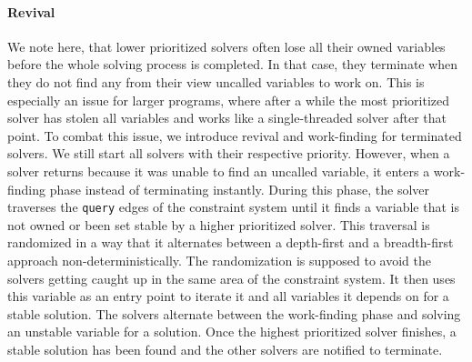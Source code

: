     \paragraph{Revival} We note here, that lower prioritized solvers often lose all their owned variables before the whole solving process is completed. In that case, they terminate when they do not find any from their view uncalled variables to work on. This is especially an issue for larger programs, where after a while the most prioritized solver has stolen all variables and works like a single-threaded solver after that point. To combat this issue, we introduce revival and work-finding for terminated solvers.
    We still start all solvers with their respective priority. However, when a solver returns because it was unable to find an uncalled variable, it enters a work-finding phase instead of terminating instantly. During this phase, the solver traverses the \texttt{query} edges of the constraint system until it finds a variable that is not owned or been set stable by a higher prioritized solver. This traversal is randomized in a way that it alternates between a depth-first and a breadth-first approach non-deterministically. The randomization is supposed to avoid the solvers getting caught up in the same area of the constraint system. It then uses this variable as an entry point to iterate it and all variables it depends on for a stable solution. The solvers alternate between the work-finding phase and solving an unstable variable for a solution. Once the highest prioritized solver finishes, a stable solution has been found and the other solvers are notified to terminate.

